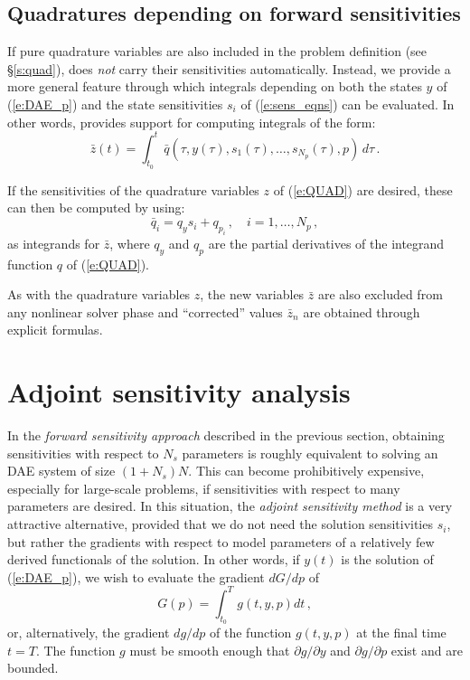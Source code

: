 \subsection{Quadratures depending on forward sensitivities}
If pure quadrature variables are also included in the problem definition
(see \S\ref{s:quad}), {\idas} does {\em not} carry their sensitivities 
automatically. Instead, we provide a more general feature through which
integrals depending on both the states $y$ of (\ref{e:DAE_p}) and the
state sensitivities $s_i$ of (\ref{e:sens_eqns}) can be evaluated. In other
words, {\idas} provides support for computing integrals of the form:
\begin{equation*}
 \bar z(t) = \int_{t_0}^t \bar q(\tau, y(\tau), s_1(\tau), \ldots, s_{N_p}(\tau),p) \, d\tau \, .
\end{equation*}

If the sensitivities of the quadrature variables $z$ of (\ref{e:QUAD}) are
desired, these can then be computed by using:
\begin{equation*}
  \bar q_i = q_y s_i + q_{p_i} \, , \quad i = 1,\ldots,N_p \, ,
\end{equation*}
as integrands for $\bar z$,
where $q_y$ and $q_p$ are the partial derivatives of the integrand function
$q$ of (\ref{e:QUAD}).

As with the quadrature variables $z$, the new variables $\bar z$ are also excluded
from any nonlinear solver phase and ``corrected'' values $\bar z_n$ are obtained
through explicit formulas. 


\section{Adjoint sensitivity analysis}\label{ss:adj_sensi}
In the {\em forward sensitivity approach} described in the previous
section, obtaining sensitivities with respect to $N_s$ parameters is roughly
equivalent to solving an DAE system of size $(1+N_s) N$. This can become 
prohibitively expensive, especially for large-scale problems, if sensitivities
with respect to many parameters are desired.
In this situation, the {\em adjoint sensitivity method} is a very
attractive alternative, provided that we do not need the solution sensitivities
$s_i$, but rather the gradients with respect to model parameters of a relatively 
few derived functionals of the solution. In other words, if $y(t)$ is the solution
of (\ref{e:DAE_p}), we wish to evaluate the gradient ${dG}/{dp}$ of
\begin{equation}\label{e:G}
G(p) = \int_{t_0}^T g(t, y, p) dt \, ,
\end{equation}
or, alternatively, the gradient ${dg}/{dp}$ of the function $g(t, y, p)$ 
at the final time $t = T$. 
The function $g$ must be smooth enough that $\partial g / \partial y$ 
and $\partial g / \partial p$ exist and are bounded. 

